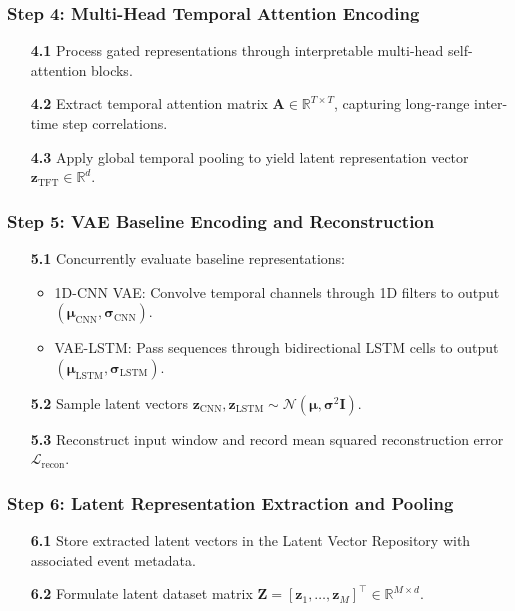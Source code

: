 \documentclass[12pt,a4paper]{report}
\begin{document}
\subsubsection*{Step 4: Multi-Head Temporal Attention Encoding}
\begin{enumerate}
  \item[\textbf{4.1}] Process gated representations through interpretable multi-head self-attention blocks.
  \item[\textbf{4.2}] Extract temporal attention matrix $\mathbf{A} \in \mathbb{R}^{T \times T}$, capturing long-range inter-time step correlations.
  \item[\textbf{4.3}] Apply global temporal pooling to yield latent representation vector $\mathbf{z}_{\text{TFT}} \in \mathbb{R}^d$.
\end{enumerate}

\subsubsection*{Step 5: VAE Baseline Encoding and Reconstruction}
\begin{enumerate}
  \item[\textbf{5.1}] Concurrently evaluate baseline representations:
    \begin{itemize}
      \item 1D-CNN VAE: Convolve temporal channels through 1D filters to output $(\boldsymbol{\mu}_{\text{CNN}}, \boldsymbol{\sigma}_{\text{CNN}})$.
      \item VAE-LSTM: Pass sequences through bidirectional LSTM cells to output $(\boldsymbol{\mu}_{\text{LSTM}}, \boldsymbol{\sigma}_{\text{LSTM}})$.
    \end{itemize}
  \item[\textbf{5.2}] Sample latent vectors $\mathbf{z}_{\text{CNN}}, \mathbf{z}_{\text{LSTM}} \sim \mathcal{N}(\boldsymbol{\mu}, \boldsymbol{\sigma}^2 \mathbf{I})$.
  \item[\textbf{5.3}] Reconstruct input window and record mean squared reconstruction error $\mathcal{L}_{\text{recon}}$.
\end{enumerate}

\subsubsection*{Step 6: Latent Representation Extraction and Pooling}
\begin{enumerate}
  \item[\textbf{6.1}] Store extracted latent vectors in the Latent Vector Repository with associated event metadata.
  \item[\textbf{6.2}] Formulate latent dataset matrix $\mathbf{Z} = [\mathbf{z}_1, \dots, \mathbf{z}_M]^\top \in \mathbb{R}^{M \times d}$.
\end{enumerate}
\end{document}
